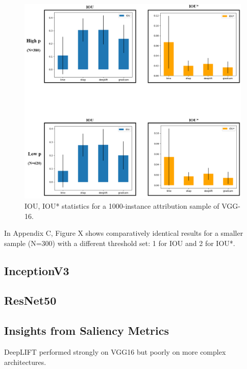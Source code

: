\documentclass[main]{subfiles}
\begin{document}
\begin{figure}[h]\centering
\vfill
\includegraphics[scale=0.32]{vgg_0_5_and_1.png}
\caption{IOU, IOU* statistics for a 1000-instance attribution sample of VGG-16. }
\label{vggAfig}
\vfill
\end{figure}

In Appendix C, Figure X shows comparatively identical results for a smaller sample (N=300) with a different threshold set: 1 for IOU and 2 for IOU*.

\newpage



\subsection{InceptionV3}




\subsection{ResNet50}


\newpage
\subsection{Insights from Saliency Metrics} \label{sec:saliency_insights}


DeepLIFT performed strongly on VGG16 but poorly on more complex architectures.
\end{document}
